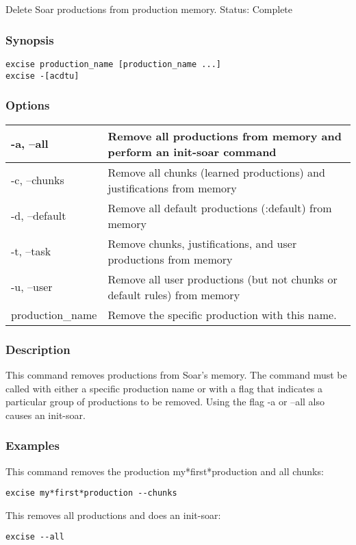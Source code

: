 \subsection{}
\label{excise}
Delete Soar productions from production memory. 
 Status: Complete
\subsubsection*{Synopsis}
  \begin{verbatim}
excise production_name [production_name ...]
excise -[acdtu]
\end{verbatim}
\subsubsection*{Options}
\begin{tabular}{|l|l|}
\hline 
 -a, --all  & Remove all productions from memory and perform an init-soar command  \\
 \hline 
 -c, --chunks  & Remove all chunks (learned productions) and justifications from memory  \\
 \hline 
 -d, --default  & Remove all default productions (:default) from memory  \\
 \hline 
 -t, --task  & Remove chunks, justifications, and user productions from memory  \\
 \hline 
 -u, --user  & Remove all user productions (but not chunks or default rules) from memory  \\
 \hline 
production\_name & Remove the specific production with this name.  \\
 \hline 
\end{tabular}
\subsubsection*{Description}
 This command removes productions from Soar's memory. The command must be called with either a specific production name or with a flag that indicates a particular group of productions to be removed. Using the flag -a or --all also causes an init-soar. 
\subsubsection*{Examples}
 This command removes the production my*first*production and all chunks: \begin{verbatim}
excise my*first*production --chunks
\end{verbatim}
 This removes all productions and does an init-soar: \begin{verbatim}
excise --all
\end{verbatim}
